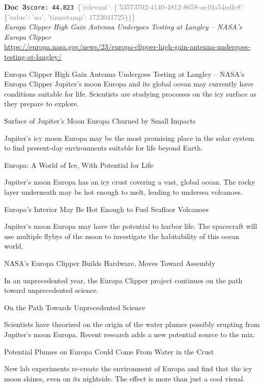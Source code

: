\documentclass[a4paper,11pt]{article}
\begin{document}
\begin{docenv}
{\footnotesize\textcolor{doccolor}{\textbf{Doc~3}}}\hfill{\tiny\texttt{score:~44.823}}\ {\tiny\textcolor{gray}{\{'relevant': \{'53573702-4140-4812-8658-ae10a54edfc8': \{'value': 'no', 'timestamp': 1723041725\}\}\}}}\\[3pt]
{\small\textit{Europa Clipper High Gain Antenna Undergoes Testing at Langley – NASA's Europa Clipper}}\\[2pt]
{\tiny\url{https://europa.nasa.gov/news/23/europa-clipper-high-gain-antenna-undergoes-testing-at-langley/}}\\[4pt]
{\footnotesize Europa Clipper High Gain Antenna Undergoes Testing at Langley – NASA's Europa Clipper
Jupiter’s moon Europa and its global ocean may currently have conditions suitable for life. Scientists are studying processes on the icy surface as they prepare to explore.

Surface of Jupiter's Moon Europa Churned by Small Impacts

Jupiter’s icy moon Europa may be the most promising place in the solar system to find present-day environments suitable for life beyond Earth. 

Europa: A World of Ice, With Potential for Life

Jupiter’s moon Europa has an icy crust covering a vast, global ocean. The rocky layer underneath may be hot enough to melt, leading to undersea volcanoes.

Europa's Interior May Be Hot Enough to Fuel Seafloor Volcanoes

Jupiter’s moon Europa may have the potential to harbor life. The spacecraft will use multiple flybys of the moon to investigate the habitability of this ocean world.

NASA's Europa Clipper Builds Hardware, Moves Toward Assembly

In an unprecedented year, the Europa Clipper project continues on the path toward unprecedented science. 

On the Path Towards Unprecedented Science

Scientists have theorized on the origin of the water plumes possibly erupting from Jupiter's moon Europa. Recent research adds a new potential source to the mix.

Potential Plumes on Europa Could Come From Water in the Crust

New lab experiments re-create the environment of Europa and find that the icy moon shines, even on its nightside. The effect is more than just a cool visual.

}
\end{docenv}
\end{document}
